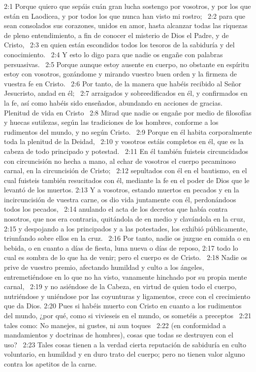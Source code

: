 2:1 Porque quiero que sepáis cuán gran lucha sostengo por vosotros, y por los que están en Laodicea, y por todos los que nunca han visto mi rostro;  
2:2 para que sean consolados sus corazones, unidos en amor, hasta alcanzar todas las riquezas de pleno entendimiento, a fin de conocer el misterio de Dios el Padre, y de Cristo,  
2:3 en quien están escondidos todos los tesoros de la sabiduría y del conocimiento.  
2:4 Y esto lo digo para que nadie os engañe con palabras persuasivas.  
2:5 Porque aunque estoy ausente en cuerpo, no obstante en espíritu estoy con vosotros, gozándome y mirando vuestro buen orden y la firmeza de vuestra fe en Cristo.  
2:6 Por tanto, de la manera que habéis recibido al Señor Jesucristo, andad en él;  
2:7 arraigados y sobreedificados en él, y confirmados en la fe, así como habéis sido enseñados, abundando en acciones de gracias.  
Plenitud de vida en Cristo  
2:8 Mirad que nadie os engañe por medio de filosofías y huecas sutilezas, según las tradiciones de los hombres, conforme a los rudimentos del mundo, y no según Cristo.  
2:9 Porque en él habita corporalmente toda la plenitud de la Deidad,  
2:10 y vosotros estáis completos en él, que es la cabeza de todo principado y potestad.  
2:11 En él también fuisteis circuncidados con circuncisión no hecha a mano, al echar de vosotros el cuerpo pecaminoso carnal, en la circuncisión de Cristo;  
2:12 sepultados con él en el bautismo, en el cual fuisteis también resucitados con él, mediante la fe en el poder de Dios que le levantó de los muertos. 
2:13 Y a vosotros, estando muertos en pecados y en la incircuncisión de vuestra carne, os dio vida juntamente con él, perdonándoos todos los pecados,  
2:14 anulando el acta de los decretos que había contra nosotros, que nos era contraria, quitándola de en medio y clavándola en la cruz, 
2:15 y despojando a los principados y a las potestades, los exhibió públicamente, triunfando sobre ellos en la cruz.  
2:16 Por tanto, nadie os juzgue en comida o en bebida, o en cuanto a días de fiesta, luna nueva o días de reposo, 
2:17 todo lo cual es sombra de lo que ha de venir; pero el cuerpo es de Cristo.  
2:18 Nadie os prive de vuestro premio, afectando humildad y culto a los ángeles, entremetiéndose en lo que no ha visto, vanamente hinchado por su propia mente carnal,  
2:19 y no asiéndose de la Cabeza, en virtud de quien todo el cuerpo, nutriéndose y uniéndose por las coyunturas y ligamentos, crece con el crecimiento que da Dios. 
2:20 Pues si habéis muerto con Cristo en cuanto a los rudimentos del mundo, ¿por qué, como si vivieseis en el mundo, os sometéis a preceptos  
2:21 tales como: No manejes, ni gustes, ni aun toques  
2:22 (en conformidad a mandamientos y doctrinas de hombres), cosas que todas se destruyen con el uso?  
2:23 Tales cosas tienen a la verdad cierta reputación de sabiduría en culto voluntario, en humildad y en duro trato del cuerpo; pero no tienen valor alguno contra los apetitos de la carne. 
